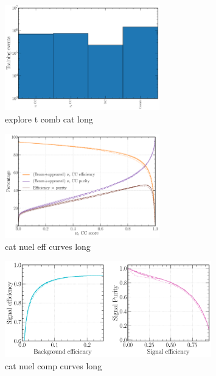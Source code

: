 \begin{figure} %
    \includegraphics[width=0.6\textwidth]{diagrams/7-cvn/chipsnet/explore_t_comb_cat.pdf}
    \caption[explore t comb cat short]
    {explore t comb cat long}
    \label{fig:explore_t_comb_cat}
\end{figure}

\begin{figure} %
    \includegraphics[width=0.6\textwidth]{diagrams/7-cvn/chipsnet/cat_nuel_eff_curves.pdf}
    \caption[cat nuel eff curves short]
    {cat nuel eff curves long}
    \label{fig:cat_nuel_eff_curves}
\end{figure}

\begin{figure} %
    \includegraphics[width=0.8\textwidth]{diagrams/7-cvn/chipsnet/cat_nuel_comp_curves.pdf}
    \caption[cat nuel comp curves short]
    {cat nuel comp curves long}
    \label{fig:cat_nuel_comp_curves}
\end{figure}


